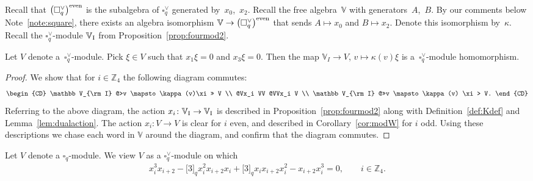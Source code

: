 Recall that $\big(\square^\vee_q\big)^{\rm even}$ is the subalgebra of $\square^\vee_q$ generated by~$x_0$,~$x_2$. Recall the free algebra~$\mathbb V$ with generators~$A$,~$B$. By our comments below Note~\ref{note:square}, there exists an algebra isomorphism $\mathbb V\to \big(\square^\vee_q\big)^{\rm even}$ that sends $A \mapsto x_0$ and $B \mapsto x_2$. Denote this isomorphism by~$\kappa $. Recall the $\square^\vee_q $-module $\mathbb V_{\rm I}$ from Proposition~\ref{prop:fourmod2}. \begin{Lemma}\label{lem:Weta} Let $V$ denote a~$\square^\vee_q$-module. Pick $\xi \in V$ such that $x_1 \xi = 0$ and $x_3 \xi = 0$. Then the map $\mathbb V_I \to V$, $v \mapsto \kappa (v) \xi$ is a~$\square^\vee_q$-module homomorphism.
\end{Lemma}
\begin{proof} We show that for $i \in {\mathbb Z}_4 $ the following diagram commutes:
\begin{gather*}
\begin{CD}
\mathbb V_{\rm I} @>v \mapsto \kappa(v)\xi >>
 V
	 \\
 @Vx_i VV @VVx_i V \\
 \mathbb V_{\rm I} @>>v \mapsto \kappa(v) \xi> V.
 \end{CD}
\end{gather*}
Referring to the above diagram, the action $x_i\colon \mathbb V_{\rm I} \to\mathbb V_{\rm I}$
is described in Proposition~\ref{prop:fourmod2} along with Definition~\ref{def:Kdef} and Lemma~\ref{lem:dualaction}. The action $x_i\colon V\to V$ is clear for $i$ even, and described in
Corollary~\ref{cor:modW} for $i$ odd. Using these descriptions we chase each word in $\mathbb V$ around the diagram, and confirm that the diagram commutes.
\end{proof}

Let $V$ denote a $\square_q$-module. We view $V$ as a $\square^\vee_q$-module on which
\begin{gather*}
 x^3_i x_{i+2} - \lbrack 3 \rbrack_q x^2_i x_{i+2} x_i + \lbrack 3 \rbrack_q x_i x_{i+2} x^2_i -x_{i+2} x^3_i = 0, \qquad i \in \mathbb Z_4.
\end{gather*}

